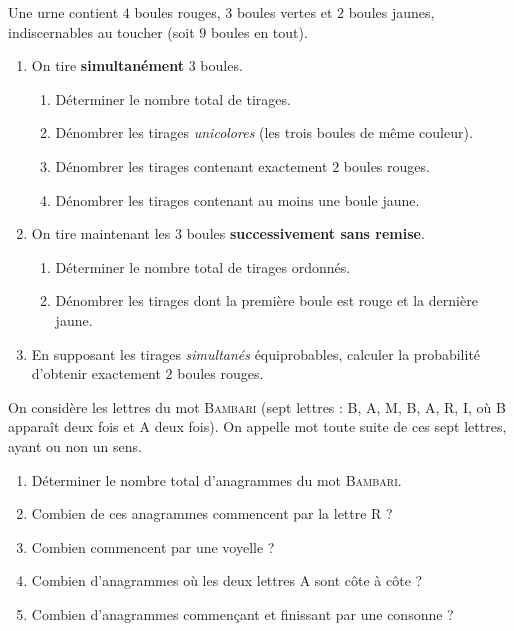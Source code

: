 Une urne contient $4$ boules rouges, $3$ boules vertes et $2$ boules jaunes,
indiscernables au toucher (soit $9$ boules en tout).
\begin{enumerate}[label=\arabic*)]
\item On tire \textbf{simultanément} $3$ boules.
\begin{enumerate}[label=\alph*)]
\item Déterminer le nombre total de tirages.
\item Dénombrer les tirages \emph{unicolores} (les trois boules de même couleur).
\item Dénombrer les tirages contenant exactement $2$ boules rouges.
\item Dénombrer les tirages contenant au moins une boule jaune.
\end{enumerate}
\item On tire maintenant les $3$ boules \textbf{successivement sans remise}.
\begin{enumerate}[label=\alph*)]
\item Déterminer le nombre total de tirages ordonnés.
\item Dénombrer les tirages dont la première boule est rouge et la dernière jaune.
\end{enumerate}
\item En supposant les tirages \emph{simultanés} équiprobables, calculer la probabilité
d'obtenir exactement $2$ boules rouges.
\end{enumerate}

On considère les lettres du mot \textsc{Bambari} (sept lettres : B, A, M, B, A, R, I, où
B apparaît deux fois et A deux fois). On appelle \og mot \fg{} toute suite de ces sept
lettres, ayant ou non un sens.
\begin{enumerate}[label=\arabic*)]
\item Déterminer le nombre total d'anagrammes du mot \textsc{Bambari}.
\item Combien de ces anagrammes commencent par la lettre R ?
\item Combien commencent par une voyelle ?
\item Combien d'anagrammes où les deux lettres A sont côte à côte ?
\item Combien d'anagrammes commençant et finissant par une consonne ?
\end{enumerate}

